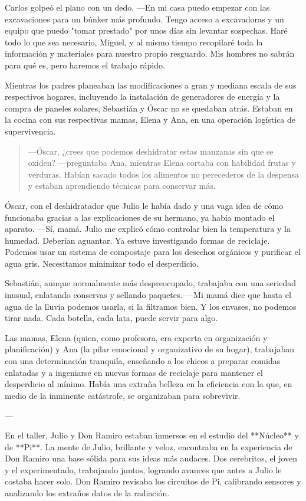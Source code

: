 \documentclass[a4paper,12pt]{book}
\begin{document}
Carlos golpeó el plano con un dedo. —En mi casa puedo empezar con las excavaciones para un búnker más profundo. Tengo acceso a excavadoras y un equipo que puedo "tomar prestado" por unos días sin levantar sospechas. Haré todo lo que sea necesario, Miguel, y al mismo tiempo recopilaré toda la información y materiales para nuestro propio resguardo. Mis hombres no sabrán para qué es, pero haremos el trabajo rápido.

Mientras los padres planeaban las modificaciones a gran y mediana escala de sus respectivos hogares, incluyendo la instalación de generadores de energía y la compra de paneles solares, Sebastián y Óscar no se quedaban atrás. Estaban en la cocina con sus respectivas mamas, Elena y Ana, en una operación logística de supervivencia.

\begin{quote}
    —Óscar, ¿crees que podemos deshidratar estas manzanas sin que se oxiden? —preguntaba Ana, mientras Elena cortaba con habilidad frutas y verduras. Habían sacado todos los alimentos no perecederos de la despensa y estaban aprendiendo técnicas para conservar más.
\end{quote}

Óscar, con el deshidratador que Julio le había dado y una vaga idea de cómo funcionaba gracias a las explicaciones de su hermano, ya había montado el aparato. —Sí, mamá. Julio me explicó cómo controlar bien la temperatura y la humedad. Deberían aguantar. Ya estuve investigando formas de reciclaje. Podemos usar un sistema de compostaje para los desechos orgánicos y purificar el agua gris. Necesitamos minimizar todo el desperdicio.

Sebastián, aunque normalmente más despreocupado, trabajaba con una seriedad inusual, enlatando conservas y sellando paquetes. —Mi mamá dice que hasta el agua de la lluvia podemos usarla, si la filtramos bien. Y los envases, no podemos tirar nada. Cada botella, cada lata, puede servir para algo.

Las mamas, Elena (quien, como profesora, era experta en organización y planificación) y Ana (la pilar emocional y organizativo de su hogar), trabajaban con una determinación tranquila, enseñando a los chicos a preparar comidas enlatadas y a ingeniarse en nuevas formas de reciclaje para mantener el desperdicio al mínimo. Había una extraña belleza en la eficiencia con la que, en medio de la inminente catástrofe, se organizaban para sobrevivir.

---

En el taller, Julio y Don Ramiro estaban inmersos en el estudio del **Núcleo** y de **Pi**. La mente de Julio, brillante y veloz, encontraba en la experiencia de Don Ramiro una base sólida para sus ideas más audaces. Dos cerebritos, el joven y el experimentado, trabajando juntos, logrando avances que antes a Julio le costaba hacer solo. Don Ramiro revisaba los circuitos de Pi, calibrando sensores y analizando los extraños datos de la radiación.
\end{document}
